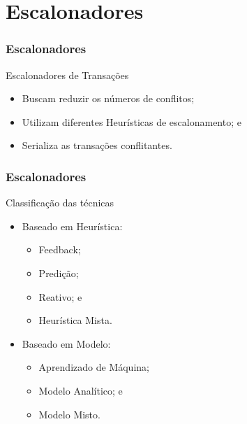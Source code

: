 \documentclass[10pt, pdf,xcolor=pdftex,dvipsnames,table]{beamer}
\begin{document}
\section{Escalonadores}
\begin{frame} \frametitle{Escalonadores}
\begin{block}{Escalonadores de Transações}
\begin{itemize}
	\item Buscam reduzir os números de conflitos;
	\item Utilizam diferentes Heurísticas de escalonamento; e
	\item Serializa as transações conflitantes.
\end{itemize}
\end{block}
\end{frame}

\begin{frame} \frametitle{Escalonadores}
\begin{block}{Classificação das técnicas}
\begin{itemize}
	\item Baseado em Heurística:
	\begin{itemize}
	    \item Feedback;
	    \item Predição;
	    \item Reativo; e
	    \item Heurística Mista.
	\end{itemize}
	\item Baseado em Modelo:
	\begin{itemize}
	    \item Aprendizado de Máquina;
	    \item Modelo Analítico; e
	    \item Modelo Misto.
	\end{itemize}
\end{itemize}
\end{block}
\end{frame}
\end{document}
